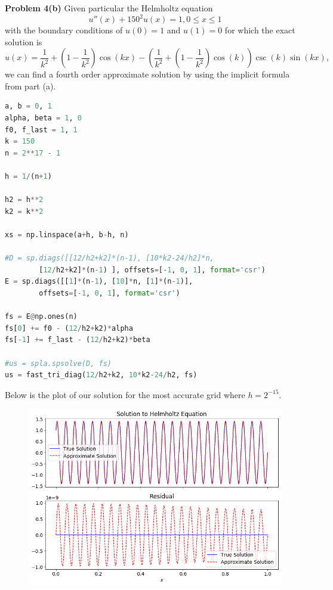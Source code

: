 \documentclass[12pt]{article}
\newcommand{\problem}[1]{\hspace{-4 ex} \large \textbf{Problem #1} }
\begin{document}
\problem{4(b)} Given particular the Helmholtz equation
$$
u''(x) + 150^2u(x) = 1, 0 \leq x \leq 1
$$
with the boundary conditions of $u(0)=1$ and $u(1)=0$ for which the exact solution is
$$
u(x) = \frac{1}{k^2} + \left(1 - \frac{1}{k^2} \right)\cos(kx) - \left( \frac{1}{k^2} + \left( 1 - \frac{1}{k^2}\right) \cos(k)\right) \csc(k) \sin(kx) \text{,}
$$
we can find a fourth order approximate solution by using the implicit formula from part (a).
\begin{lstlisting}[language=Python]
a, b = 0, 1
alpha, beta = 1, 0
f0, f_last = 1, 1
k = 150
n = 2**17 - 1

h = 1/(n+1)

h2 = h**2
k2 = k**2

xs = np.linspace(a+h, b-h, n)

#D = sp.diags([[12/h2+k2]*(n-1), [10*k2-24/h2]*n, 
		[12/h2+k2]*(n-1) ], offsets=[-1, 0, 1], format='csr')
E = sp.diags([[1]*(n-1), [10]*n, [1]*(n-1)], 
		offsets=[-1, 0, 1], format='csr')

fs = E@np.ones(n)
fs[0] += f0 - (12/h2+k2)*alpha
fs[-1] += f_last - (12/h2+k2)*beta

#us = spla.spsolve(D, fs)
us = fast_tri_diag(12/h2+k2, 10*k2-24/h2, fs)
\end{lstlisting}
\bigbreak

Below is the plot of our solution for the most accurate grid where $h = 2^{-15}$.
\begin{figure}[H]
	\includegraphics[width=1\textwidth]{hw02_p4a_solution}
	\centering
\end{figure}
\end{document}
